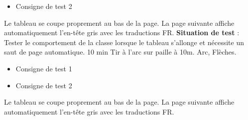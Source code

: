 \documentclass{../tex/ficheseance}
\begin{document}
\begin{tableauSeance}
{\begin{itemize}
			\item Consigne de test 2
		\end{itemize}}
		{Le tableau se coupe proprement au bas de la page.}
		{La page suivante affiche automatiquement l'en-tête gris avec les traductions FR.}		
		\ligneSeance
		{\textbf{Situation de test} : Tester le comportement de la classe lorsque le tableau s'allonge et nécessite un saut de page automatique.}
		{10 min}
		{Tir à l'arc sur paille à 10m.}
		{Arc, Flèches.}
		{\begin{itemize}
			\item Consigne de test 1
			\item Consigne de test 2
		\end{itemize}}
		{Le tableau se coupe proprement au bas de la page.}
		{La page suivante affiche automatiquement l'en-tête gris avec les traductions FR.}		
	\end{tableauSeance}
	
\end{document}
